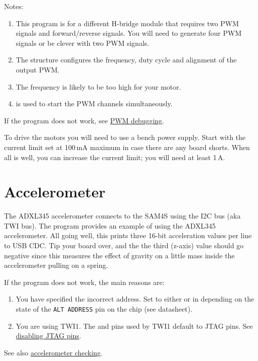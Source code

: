 Notes:
%
\begin{enumerate}
\item
  This program is for a different H-bridge module that requires two
  PWM signals and forward/reverse signals. You will need to generate
  four PWM signals or be clever with two PWM signals.

\item
  The  structure configures the frequency, duty cycle
  and alignment of the output PWM.

\item The frequency is likely to be too high for your motor.

\item {} is used to start the PWM channels
  simultaneously.
\end{enumerate}

If the program does not work, see  \hyperref[debugging-pwm]{PWM debugging}.

To drive the motors you will need to use a bench power supply. Start
with the current limit set at 100\,mA maximum in case there are any
board shorts.  When all is well, you can increase the current limit;
you will need at least 1\,A.

\section{Accelerometer}
\label{accelerometer-test}

The ADXL345 accelerometer connects to the SAM4S using the I2C bus (aka
TWI bus).  The program
 provides
an example of using the ADXL345 accelerometer.  All going well, this
prints three 16-bit acceleration values per line to USB CDC. Tip your
board over, and the the third (z-axis) value should go negative since
this measures the effect of gravity on a little mass inside the
accelerometer pulling on a spring.

If the program does not work, the main reasons are:

\begin{enumerate}
\item
  You have specified the incorrect address.  Set
   to either  or  in
   depending on the state of the \verb|ALT ADDRESS| pin
  on the chip (see datasheet).
\item
  You are using TWI1. The  and  pins used by TWI1
  default to JTAG pins. See
  \protect\hyperref[disabling-jtag-pins]{disabling JTAG pins}.
\end{enumerate}
%
See also \protect\hyperref[checking-accelerometer]{accelerometer checking}.


